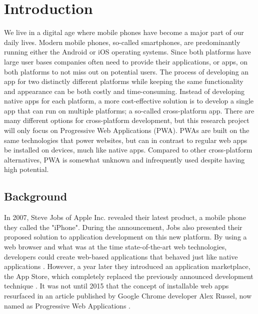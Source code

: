 \documentclass[a4paper,12pt]{article}
\begin{document}
\newpage
{}

\section{Introduction}
\label{Intro}
We live in a digital age where mobile phones have become a major part of our daily lives. Modern mobile phones, so-called smartphones, are predominantly running either the Android or iOS operating systems. Since both platforms have large user bases companies often need to provide their applications, or apps, on both platforms to not miss out on potential users. The process of developing an app for two distinctly different platforms while keeping the same functionality and appearance can be both costly and time-consuming. Instead of developing native apps for each platform, a more cost-effective solution is to develop a single app that can run on multiple platforms; a so-called cross-platform app. There are many different options for cross-platform development, but this research project will only focus on Progressive Web Applications (PWA). PWAs are built on the same technologies that power websites, but can in contrast to regular web apps be installed on devices, much like native apps. Compared to other cross-platform alternatives, PWA is somewhat unknown and infrequently used despite having high potential.

\subsection{Background}
\label{Intro_background}
In 2007, Steve Jobs of Apple Inc. revealed their latest product, a mobile phone they called the "iPhone". During the announcement, Jobs also presented their proposed solution to application development on this new platform. By using a web browser and what was at the time state-of-the-art web technologies, developers could create web-based applications that behaved just like native applications \cite{stevejobs_pwa}. However, a year later they introduced an application marketplace, the App Store, which completely replaced the previously announced development technique \cite{stevejobs_appstore}. It was not until 2015 that the concept of installable web apps resurfaced in an article published by Google Chrome developer Alex Russel, now named as Progressive Web Applications \cite{russel_pwa}.
\end{document}
